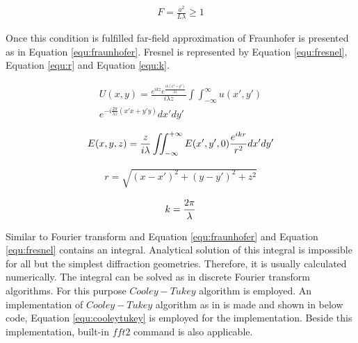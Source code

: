 \documentclass[journal,9pt]{IEEEtran}
\begin{document}
\begin{equation}
\label{equ:fresnelstatement}
\begin{split}
F = \frac{a^2}{L\lambda} \ge 1 
\end{split}
\end{equation}

Once this condition is fulfilled far-field approximation of Fraunhofer is presented as in Equation \ref{equ:fraunhofer}. Fresnel is represented by Equation \ref{equ:fresnel}, Equation \ref{equ:r} and Equation \ref{equ:k}.

\begin{equation}
\label{equ:fraunhofer}
\begin{split}
U(x,y)=\frac{e^{ikz}e^{\frac{ik(x^2+y^2)}{2z}}}{i\lambda z}\int\int_{-\infty}^{\infty}u(x',y')\\
e^{-i\frac{2\pi}{\lambda z}(x'x+y'y)}dx'dy'
\end{split}
\end{equation}

\begin{equation}
\label{equ:fresnel}
\begin{split}
E(x,y,z)={z \over {i \lambda}} \iint_{-\infty}^{+\infty}{ E(x',y',0) \frac{e^{ikr}}{r^2}}dx'dy' 
\end{split}
\end{equation}

\begin{equation}
\label{equ:r}
\begin{split}
r=\sqrt{(x-x')^2+(y-y')^2+z^2}
\end{split}
\end{equation}

\begin{equation}
\label{equ:k}
\begin{split}
k = { 2 \pi \over \lambda }
\end{split}
\end{equation}


Similar to Fourier transform and Equation \ref{equ:fraunhofer} and Equation \ref{equ:fresnel} contains an integral. Analytical solution of this integral is impossible for all but the simplest diffraction geometries. Therefore, it is usually calculated numerically. The integral can be solved as in discrete Fourier transform algorithms. For this purpose $Cooley-Tukey$ algorithm is employed. An implementation of $Cooley-Tukey$ algorithm as in \cite{cooleytukey} is made and shown in below code, Equation \ref{equ:cooleytukey} is employed for the implementation. Beside this implementation, built-in $fft2$ command is also applicable.
\end{document}
